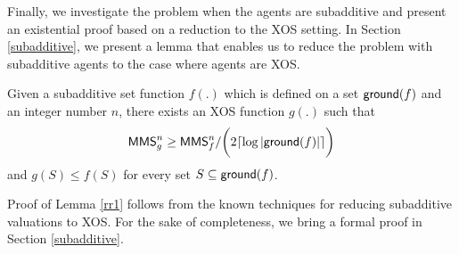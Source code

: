 Finally, we investigate the problem when the agents are subadditive and present an existential proof based on a reduction to the XOS setting. In Section \ref{subadditive}, we present a lemma that enables us to 
reduce the problem with subadditive agents to the case where agents are XOS.
\begin{lemma}\label{rr1}
	Given a subadditive set function $f(.)$ which is defined on a set $\mathsf{ground}(f)$ and an integer number $n$, there exists an XOS function $g(.)$ such that  
	$$\mathsf{MMS}_g^n \geq \mathsf{MMS}_f^n / \bigg( 2 \lceil \log |\mathsf{ground}(f)|\rceil \bigg)$$
	and $g(S) \leq f(S)$ for every set $S \subseteq \mathsf{ground}(f)$.
\end{lemma}
Proof of Lemma \ref{rr1} follows from the known techniques for reducing subadditive valuations to XOS. For the sake of completeness, we bring a formal proof in Section \ref{subadditive}.
